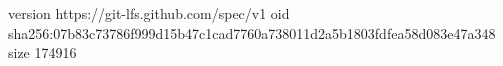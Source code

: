version https://git-lfs.github.com/spec/v1
oid sha256:07b83c73786f999d15b47c1cad7760a738011d2a5b1803fdfea58d083e47a348
size 174916
